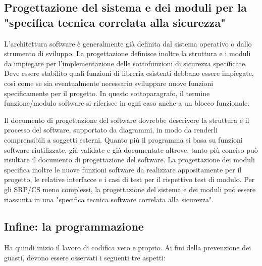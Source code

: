 \subsection{Progettazione del sistema e dei moduli per la "specifica tecnica correlata alla sicurezza"}
\label{subsec:06-3-3}
L'architettura software è generalmente già definita dal sistema operativo o dallo strumento di sviluppo. La progettazione definisce inoltre la struttura e i moduli da impiegare per l'implementazione delle sottofunzioni di sicurezza specificate. Deve essere stabilito quali funzioni di libreria esistenti debbano essere impiegate, così come se sia eventualmente necessario sviluppare nuove funzioni specificamente per il progetto. In questo sottoparagrafo, il termine funzione/modulo software si riferisce in ogni caso anche a un blocco funzionale.

Il documento di progettazione del software dovrebbe descrivere la struttura e il processo del software, supportato da diagrammi, in modo da renderli comprensibili a soggetti esterni. Quanto più il programma si basa su funzioni software riutilizzate, già validate e già documentate altrove, tanto più conciso può risultare il documento di progettazione del software. La progettazione dei moduli specifica inoltre le nuove funzioni software da realizzare appositamente per il progetto, le relative interfacce e i casi di test per il rispettivo test di modulo. Per gli SRP/CS meno complessi, la progettazione del sistema e dei moduli può essere riassunta in una "specifica tecnica software correlata alla sicurezza".

\subsection{Infine: la programmazione}
\label{subsec:06-3-4}
Ha quindi inizio il lavoro di codifica vero e proprio. Ai fini della prevenzione dei guasti, devono essere osservati i seguenti tre aspetti:

